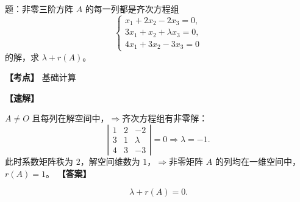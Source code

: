 ﻿\documentclass[11pt,a4paper,UTF8]{ctexart}
\begin{document}
\begin{answerbox}[2024--2025 填空 5]
题：非零三阶方阵 $A$ 的每一列都是齐次方程组
\[
\begin{cases}
x_1+2x_2-2x_3=0,\\
3x_1+x_2+\lambda x_3=0,\\
4x_1+3x_2-3x_3=0
\end{cases}
\]
的解，求 $\lambda+r(A)$。

\textbf{【考点】} 基础计算

\textbf{【速解】}

$A\ne O$ 且每列在解空间中，$\Rightarrow$齐次方程组有非零解：
\[
\left|\begin{matrix}1&2&-2\\3&1&\lambda\\4&3&-3\end{matrix}\right|=0
\Rightarrow \lambda=-1.
\]
此时系数矩阵秩为 $2$，解空间维数为 $1$，$\Rightarrow$非零矩阵 $A$ 的列均在一维空间中，$r(A)=1$。
\textbf{【答案】}

\[\lambda+r(A)=0.\]
\end{answerbox}
\end{document}
